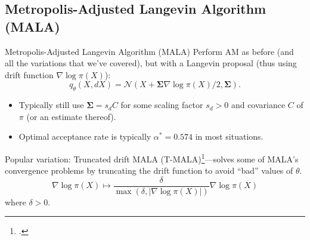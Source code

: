 \documentclass[aspectratio=169]{beamer}
\begin{document}
\subsection{Metropolis-Adjusted Langevin Algorithm (MALA)}
\begin{frame}{Metropolis-Adjusted Langevin Algorithm (MALA)}
    Perform AM as before (and all the variations that we've covered), but with a Langevin proposal (thus using drift function $\nabla \log \pi (X)$):
    $$q_\theta(X, dX) = \mathcal{N}(X + \bm{\Sigma} \nabla \log \pi(X)/2, \bm{\Sigma}).$$

    \pause

    \begin{itemize}
        \item Typically still use $\bm{\Sigma} = s_d C$ for some scaling factor $s_d > 0$ and covariance $C$ of $\pi$ (or an estimate thereof).
        \pause

        \item Optimal acceptance rate is typically $\alpha^* = 0.574$ in most situations.
    \end{itemize}

    \vspace{1em}
    \pause
    Popular variation: Truncated drift MALA (T-MALA)\footcite{atchade_adaptive_2006}---solves some of MALA's convergence problems by truncating the drift function to avoid ``bad'' values of $\theta$.
    $$\nabla \log \pi(X) \mapsto \frac{\delta}{\max(\delta, |\nabla \log \pi(X)|)}\nabla \log \pi(X)$$
    where $\delta > 0$.

\end{frame}
\end{document}
